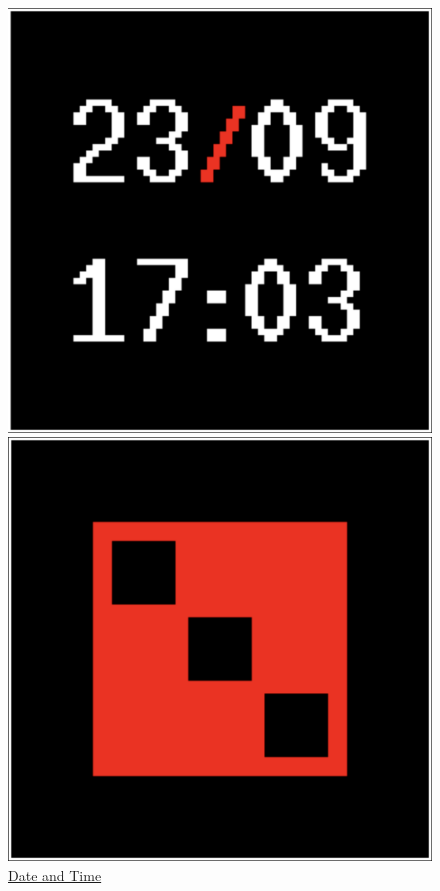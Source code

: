 \begin{figure}[h]
\begin{minipage}[b]{0.24\textwidth}
        \includegraphics[width=\textwidth]{tesi/img/stylized_widgets/datetime.png}
        \caption*{\href{https://github.com/mosaico-widgets/date-and-time}{Date and Time} }
    \end{minipage}
    \begin{minipage}[b]{0.24\textwidth}
        \centering
        \includegraphics[width=\textwidth]{tesi/img/stylized_widgets/dice.png}

\end{minipage}
\end{figure}
